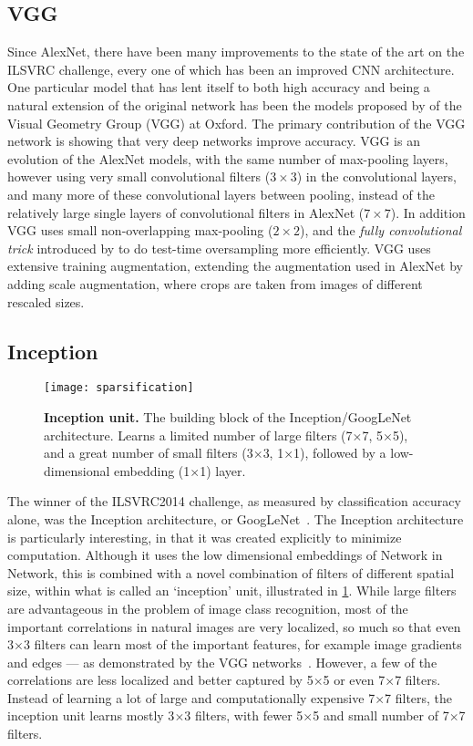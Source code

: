 \documentclass[thesis]{subfiles}
\begin{document}
\subsection{VGG}
Since AlexNet, there have been many improvements to the state of the art on the ILSVRC challenge, every one of which has been an improved CNN architecture. One particular model that has lent itself to both high accuracy and being a natural extension of the original network has been the models proposed by \citet{Simonyan2014verydeep} of the Visual Geometry Group (VGG) at Oxford. The primary contribution of the VGG network is showing that very deep networks improve accuracy. VGG is an evolution of the AlexNet models, with the same number of max-pooling layers, however using very small convolutional filters ($3 \times 3$) in the convolutional layers, and many more of these convolutional layers between pooling, instead of the relatively large single layers of convolutional filters in AlexNet ($7\times 7$). In addition VGG uses small non-overlapping max-pooling ($2\times 2$), and the \emph{fully convolutional trick} introduced by \citet{Sermanet2013overfeat} to do test-time oversampling more efficiently. VGG uses extensive training augmentation, extending the augmentation used in AlexNet \citep{Krizhevsky2012} by adding scale augmentation, where crops are taken from images of different rescaled sizes. 


\subsection{Inception}
\begin{figure}
	\centering
	\texttt{[image: sparsification]}
	\caption[Illustration of the Inception unit.]{\textbf{Inception unit.} The building block of the Inception/GoogLeNet architecture. Learns a limited number of large filters (7$\times$7, 5$\times$5), and a great number of small filters (3$\times$3, 1$\times$1), followed by a low-dimensional embedding (1$\times$1) layer.}\label{fig:inceptionunit}
\end{figure}
The winner of the ILSVRC2014 challenge, as measured by classification accuracy alone, was the Inception architecture, or GoogLeNet~\citep{Szegedy2014going}. The Inception architecture is particularly interesting, in that it was created explicitly to minimize computation. Although it uses the low dimensional embeddings of Network in Network, this is combined with a novel combination of filters of different spatial size, within what is called an `inception' unit, illustrated in \cref{fig:inceptionunit}. While large filters are advantageous in the problem of image class recognition, most of the important correlations in natural images are very localized, so much so that even 3$\times$3 filters can learn most of the important features, for example image gradients and edges --- as demonstrated by the VGG networks~\citep{Simonyan2014verydeep}. However, a few of the correlations are less localized and better captured by 5$\times$5 or even 7$\times$7 filters. Instead of learning a lot of large and computationally expensive 7$\times$7 filters, the inception unit learns mostly 3$\times$3 filters, with fewer 5$\times$5 and small number of 7$\times$7 filters. 
\end{document}
